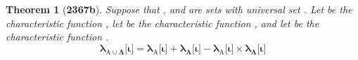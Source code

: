 \documentclass[preview]{standalone}
\newtheorem*{theorem*}{Theorem}
\begin{document}
\begin{theorem*}[\textbf{2367b}]
    Suppose that , and \bm{$\Lambda$} are sets with universal set \bm{$\Omega$}. 
    Let  be the characteristic function 
    ,
    let  be the characteristic function 
    ,
    and let \bm{$\lambda_{\Lambda}$} be the characteristic function 
    .
    \begin{equation*}
        \bm{
            \lambda_{\mathrm{A} \cup \Lambda} \big[ \iota \big] 
                = 
            \lambda_{\mathrm{A}} \big[ \iota \big] 
                + 
            \lambda_{\Lambda} \big[ \iota \big] 
                - 
            \lambda_{\mathrm{A}} \big[ \iota \big]
                \times 
            \lambda_{\Lambda} \big[ \iota \big]
        }
    \end{equation*}
\end{theorem*}
\end{document}
